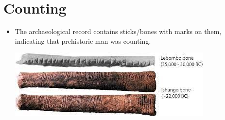 \documentclass[letterpaper,12pt,fleqn]{article}
\begin{document}
\section*{Counting}

\begin{itemize}[left=0in]

\item The archaeological record contains sticks/bones with marks on them, indicating that prehistoric man was
  counting.
  \begin{center}
    \includegraphics{bones}
  \end{center}


\end{itemize}
\end{document}
